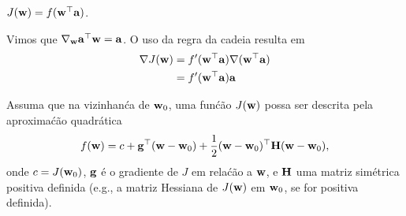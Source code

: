 \begin{exenumerate}
    \item $J(\mathbf{w})=f(\mathbf{w}^\top\mathbf{a})$.
    
    \begin{solution}
        Vimos que $\nabla_{\mathbf{w}} \mathbf{a}^\top\mathbf{w} = \mathbf{a}$. O uso da regra da cadeia resulta em
        \begin{align}
            \nabla J(\mathbf{w})  &= f'(\mathbf{w}^\top\mathbf{a})\nabla (\mathbf{w}^\top\mathbf{a}) \\
            &= f'(\mathbf{w}^\top\mathbf{a}) \mathbf{a}
        \end{align}
        
        
    \end{solution}
    
\end{exenumerate}


\label{ex:newtons_method}
Assuma que na vizinhan\'ca de $\mathbf{w}_0$, uma fun\'c\~ao $J(\mathbf{w})$ possa ser descrita pela aproxima\'c\~ao quadr\'atica
\begin{equation}
    f(\mathbf{w})=c+ \mathbf{g}^\top(\mathbf{w}-\mathbf{w}_0)+\frac{1}{2}(\mathbf{w}-\mathbf{w}_0)^\top \mathbf{H}(\mathbf{w}-\mathbf{w}_0),
\end{equation}
onde $c=J(\mathbf{w}_0)$, $\mathbf{g}$ \'e o gradiente de $J$ em rela\'c\~ao a $\mathbf{w}$, e $\mathbf{H}$ uma
matriz sim\'etrica positiva definida (e.g., a matriz Hessiana de $J(\mathbf{w})$ em
$\mathbf{w}_0$, se for positiva definida).

